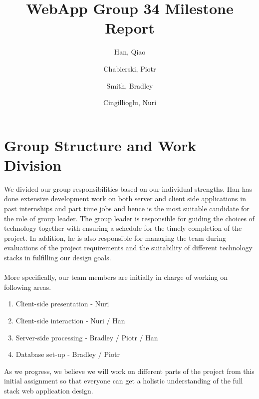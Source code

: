 \documentclass[10pt,a4paper]{article}
\begin{document}
\title{WebApp Group 34 Milestone Report}
\author{
  Han, Qiao\\
  \and
  Chabierski, Piotr\\
  \and
  Smith, Bradley\\
  \and
  Cingillioglu, Nuri\\
}

\maketitle

\section{Group Structure and Work Division}

\noindent
We divided our group responsibilities based on our individual strengths. Han has done extensive development work on both server and client side applications in past internships and part time jobs and hence is the most suitable candidate for the role of group leader. The group leader is responsible for guiding the choices of technology together with ensuring a schedule for the timely completion of the project. In addition, he is also responsible for managing the team during evaluations of the project requirements and the suitability of different technology stacks in fulfilling our design goals.
\\
\\
\noindent
More specifically, our team members are initially in charge of working on following areas.

\begin{enumerate}
  \item Client-side presentation - Nuri
  \item Client-side interaction - Nuri / Han
  \item Server-side processing - Bradley / Piotr / Han
  \item Database set-up - Bradley / Piotr
\end{enumerate}
\noindent
As we progress, we believe we will work on different parts of the project from this initial assignment so that everyone can get a holistic understanding of the full stack web application design.
\end{document}
